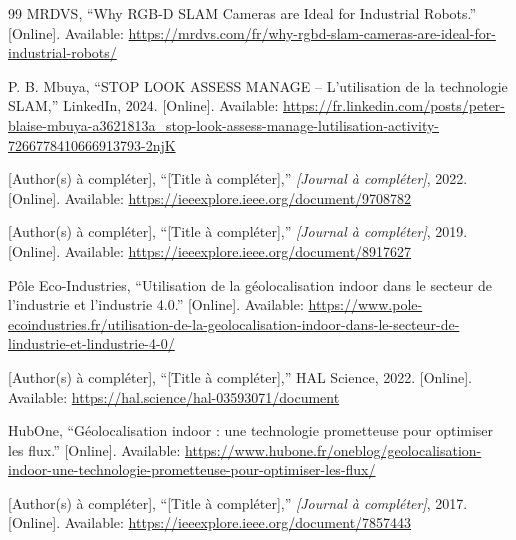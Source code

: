 \documentclass{ipgpmaster}
\begin{document}
\begin{thebibliography}{99}
MRDVS, ``Why RGB-D SLAM Cameras are Ideal for Industrial Robots.'' [Online]. Available: \url{https://mrdvs.com/fr/why-rgbd-slam-cameras-are-ideal-for-industrial-robots/}

P. B. Mbuya, ``STOP LOOK ASSESS MANAGE -- L'utilisation de la technologie SLAM,'' LinkedIn, 2024. [Online]. Available: \url{https://fr.linkedin.com/posts/peter-blaise-mbuya-a3621813a_stop-look-assess-manage-lutilisation-activity-7266778410666913793-2njK}

[Author(s) à compléter], ``[Title à compléter],'' \textit{[Journal à compléter]}, 2022. [Online]. Available: \url{https://ieeexplore.ieee.org/document/9708782}

[Author(s) à compléter], ``[Title à compléter],'' \textit{[Journal à compléter]}, 2019. [Online]. Available: \url{https://ieeexplore.ieee.org/document/8917627}

Pôle Eco-Industries, ``Utilisation de la géolocalisation indoor dans le secteur de l'industrie et l'industrie 4.0.'' [Online]. Available: \url{https://www.pole-ecoindustries.fr/utilisation-de-la-geolocalisation-indoor-dans-le-secteur-de-lindustrie-et-lindustrie-4-0/}

[Author(s) à compléter], ``[Title à compléter],'' HAL Science, 2022. [Online]. Available: \url{https://hal.science/hal-03593071/document}

HubOne, ``Géolocalisation indoor : une technologie prometteuse pour optimiser les flux.'' [Online]. Available: \url{https://www.hubone.fr/oneblog/geolocalisation-indoor-une-technologie-prometteuse-pour-optimiser-les-flux/}

[Author(s) à compléter], ``[Title à compléter],'' \textit{[Journal à compléter]}, 2017. [Online]. Available: \url{https://ieeexplore.ieee.org/document/7857443}

\end{thebibliography}
\newpage

            
\newpage

\appendix %
\end{document}
